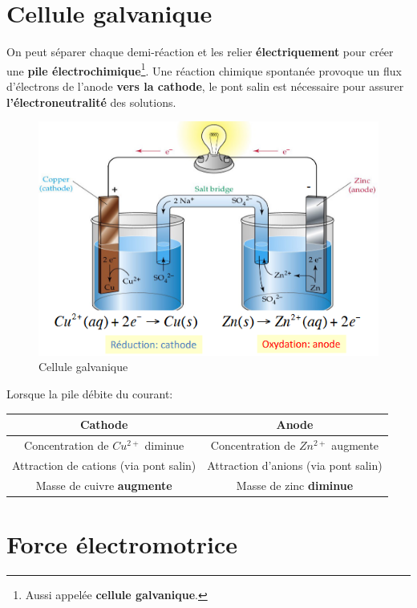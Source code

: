 \documentclass[10pt,a4paper]{book}
\begin{document}
\section{Cellule galvanique}

On peut séparer chaque demi-réaction et les relier \textbf{électriquement} pour créer une \textbf{pile électrochimique}\footnote{Aussi appelée \textbf{cellule galvanique}.}.
Une réaction chimique spontanée provoque un flux d'électrons de l'anode \textbf{vers la cathode}, le pont salin est nécessaire pour assurer \textbf{l'électroneutralité} des solutions.
\begin{figure}[h!]
\begin{center}
\includegraphics[scale=0.75]{./assets/cellule_galvanique.png}
\end{center}
\caption{Cellule galvanique}
\label{fig:galv_cell}
\end{figure}
Lorsque la pile débite du courant: \\
\begin{center}
\begin{tabular}{| c | c |}
\hline
\textbf{Cathode} & \textbf{Anode} \\
\hline
Concentration de $Cu^{2+}$ diminue & Concentration de $Zn^{2+}$ augmente \\
\hline
Attraction de cations (via pont salin) & Attraction d'anions (via pont salin) \\
\hline
Masse de cuivre \textbf{augmente} & Masse de zinc \textbf{diminue} \\
\hline
\end{tabular}
\end{center}

\section{Force électromotrice}
\end{document}
